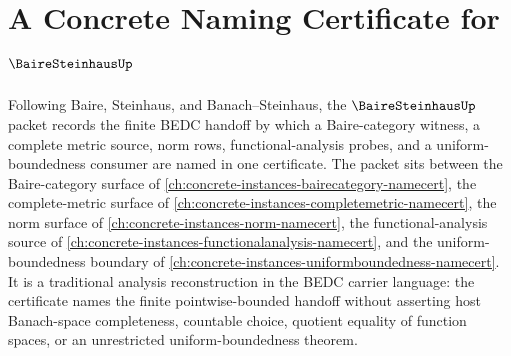 \chapter{A Concrete Naming Certificate for $\BaireSteinhausUp$}
\label{ch:concrete-instances-baire-steinhaus-namecert}

Following Baire, Steinhaus, and Banach--Steinhaus, the $\BaireSteinhausUp$ packet records the finite BEDC handoff by which a Baire-category witness, a complete metric source, norm rows, functional-analysis probes, and a uniform-boundedness consumer are named in one certificate. The packet sits between the Baire-category surface of \autoref{ch:concrete-instances-bairecategory-namecert}, the complete-metric surface of \autoref{ch:concrete-instances-completemetric-namecert}, the norm surface of \autoref{ch:concrete-instances-norm-namecert}, the functional-analysis source of \autoref{ch:concrete-instances-functionalanalysis-namecert}, and the uniform-boundedness boundary of \autoref{ch:concrete-instances-uniformboundedness-namecert}. It is a traditional analysis reconstruction in the BEDC carrier language: the certificate names the finite pointwise-bounded handoff without asserting host Banach-space completeness, countable choice, quotient equality of function spaces, or an unrestricted uniform-boundedness theorem.

